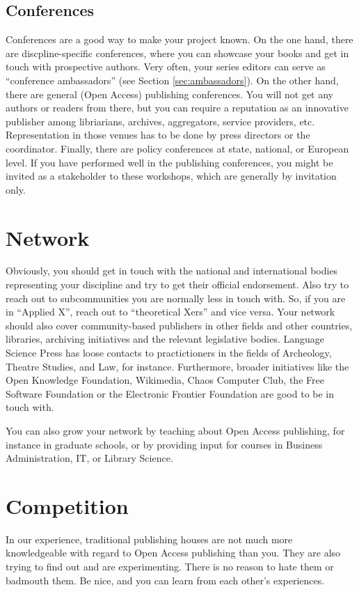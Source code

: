 \documentclass[guidelines,nonflat,modfonts] {langsci/langscibook}
\begin{document}
\subsection{Conferences}
Conferences are a good way to make your project known. On the one hand, there are discpline-specific conferences, where you can showcase your books and get in touch with prospective authors. Very often, your series editors can serve as ``conference ambassadors'' (see Section \ref{sec:ambassadors}). On the other hand, there are general (Open Access) publishing conferences. You will not get any authors or readers from there, but you can require a reputation as an innovative publisher among libriarians, archives, aggregators, service providers, etc. Representation in those venues has to be done by press directors or the coordinator. Finally, there are policy conferences at state, national, or  European level. If you have performed well in the publishing conferences, you might be invited as a stakeholder to these workshops, which are generally by invitation only. 

\section{Network}\label{sec:network}
Obviously, you should get in touch with the national and international bodies representing your discipline and try to get their official endorsement. Also try to reach out to subcommunities you are normally less in touch with. So, if you are in ``Applied X'', reach out to ``theoretical Xers'' and vice versa. Your network should also cover community-based publishers in other fields and other countries, libraries, archiving initiatives and the relevant legislative bodies. Language Science Press has loose contacts to practictioners in the fields of Archeology, Theatre Studies, and Law, for instance. 
Furthermore, broader initiatives like the Open Knowledge Foundation, Wikimedia, Chaos Computer Club, the Free Software Foundation or the Electronic Frontier Foundation are good to be in touch with.

You can also grow your network by teaching about Open Access publishing, for instance in graduate schools, or by providing input for courses in Business Administration, IT, or Library Science. 

\section{Competition}\label{sec:competition}
In our experience, traditional publishing houses are not much more knowledgeable with regard to Open Access publishing than you. They are also trying to find out and are experimenting. There is no reason to hate them or badmouth them. Be nice, and you can learn from each other's experiences. 
\end{document}
